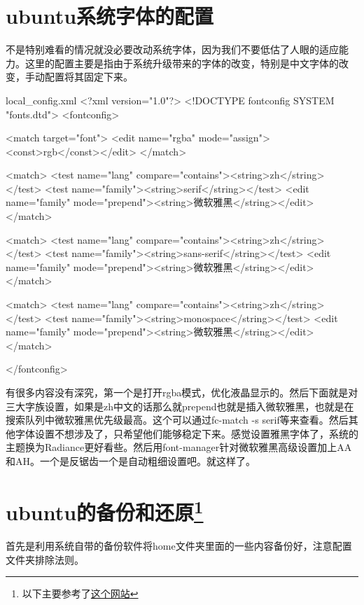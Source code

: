 \documentclass[11pt,oneside]{book}
\begin{document}
\begin{common-format}
\section{ubuntu系统字体的配置}
不是特别难看的情况就没必要改动系统字体，因为我们不要低估了人眼的适应能力。这里的配置主要是指由于系统升级带来的字体的改变，特别是中文字体的改变，手动配置将其固定下来。
\begin{xverbatim}{local_config.xml}
<?xml version="1.0"?>
<!DOCTYPE fontconfig SYSTEM "fonts.dtd">
<fontconfig>

<match target="font">
	<edit name="rgba" mode="assign"><const>rgb</const></edit>
</match>

<match>
	<test name="lang" compare="contains"><string>zh</string></test>
	<test name="family"><string>serif</string></test>
	<edit name="family" mode="prepend"><string>微软雅黑</string></edit>
</match>

<match>
	<test name="lang" compare="contains"><string>zh</string></test>
	<test name="family"><string>sans-serif</string></test>
	<edit name="family" mode="prepend"><string>微软雅黑</string></edit>
</match>

<match>
	<test name="lang" compare="contains"><string>zh</string></test>
	<test name="family"><string>monospace</string></test>
	<edit name="family" mode="prepend"><string>微软雅黑</string></edit>
</match>	

</fontconfig>
\end{xverbatim}
有很多内容没有深究，第一个是打开rgba模式，优化液晶显示的。然后下面就是对三大字族设置，如果是zh中文的话那么就prepend也就是插入微软雅黑，也就是在搜索队列中微软雅黑优先级最高。这个可以通过fc-match  -s  serif等来查看。然后其他字体设置不想涉及了，只希望他们能够稳定下来。感觉设置雅黑字体了，系统的主题换为Radiance更好看些。然后用font-manager针对微软雅黑高级设置加上AA和AH。一个是反锯齿一个是自动粗细设置吧。就这样了。


\section[ubuntu的备份和还原]{ubuntu的备份和还原\footnote{以下主要参考了\href{http://www.matthartley.com/how-to-backup-your-ubuntu-software/}{这个网站}}}
首先是利用系统自带的备份软件将home文件夹里面的一些内容备份好，注意配置文件夹排除法则。


\end{common-format}
\end{document}
